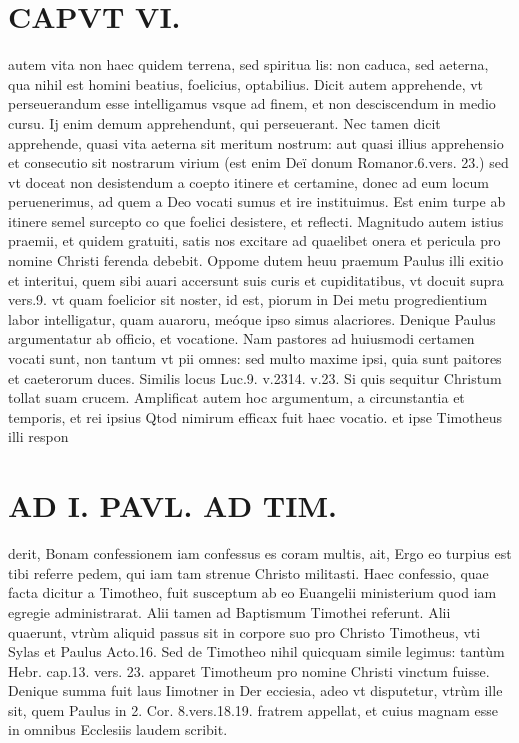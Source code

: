 \documentclass{article}
\begin{document}
\begin{pages}
\section*{CAPVT  VI. }
\marginpar{[ p.46. ]}\pstart autem vita non haec quidem terrena, sed spiritua lis: non caduca, sed aeterna, qua nihil est homini beatius, foelicius, optabilius. Dicit autem apprehende, vt perseuerandum esse intelligamus vsque ad finem, et non desciscendum in medio cursu. Ij enim demum apprehendunt, qui perseuerant. Nec tamen dicit apprehende, quasi vita aeterna sit meritum nostrum: aut quasi illius apprehensio et consecutio sit nostrarum virium (est enim Deï donum Romanor.6.vers. 23.) sed vt doceat non desistendum a coepto itinere et certamine, donec ad eum locum peruenerimus, ad quem a Deo vocati sumus et ire instituimus. Est enim turpe ab itinere semel surcepto co que foelici desistere, et reflecti. Magnitudo autem istius praemii, et quidem gratuiti, satis nos excitare ad quaelibet onera et pericula pro nomine Christi ferenda debebit.  \pend\pstart Oppome dutem heuu praemum Paulus illi exitio et interitui, quem sibi auari accersunt suis curis et cupiditatibus, vt docuit supra vers.9. vt quam foelicior sit noster, id est, piorum in Dei metu progredientium labor intelligatur, quam auaroru, meóque ipso simus alacriores.  \pend\pstart Denique Paulus argumentatur ab officio, et vocatione. Nam pastores ad huiusmodi certamen vocati sunt, non tantum vt pii omnes: sed multo maxime ipsi, quia sunt paitores et caeterorum duces. Similis locus Luc.9. v.2314. v.23. Si quis sequitur Christum tollat suam crucem. Amplificat autem hoc argumentum, a circunstantia et temporis, et rei ipsius Qtod nimirum efficax fuit haec vocatio. et ipse Timotheus illi respon\pend
\section*{AD I. PAVL. AD TIM. }
\marginpar{[ p.466 ]}\pstart derit, Bonam confessionem iam confessus es coram multis, ait, Ergo eo turpius est tibi referre pedem, qui iam tam strenue Christo militasti. Haec confessio, quae facta dicitur a Timotheo, fuit susceptum ab eo Euangelii ministerium quod iam egregie administrarat. Alii tamen ad Baptismum Timothei referunt. Alii quaerunt, vtrùm aliquid passus sit in corpore suo pro Christo Timotheus, vti Sylas et Paulus Acto.16. Sed de Timotheo nihil quicquam simile legimus: tantùm Hebr. cap.13. vers. 23. apparet Timotheum pro nomine Christi vinctum fuisse. Denique summa fuit laus Iimotner in Der ecciesia, adeo vt disputetur, vtrùm ille sit, quem Paulus in 2. Cor. 8.vers.18.19. fratrem appellat, et cuius magnam esse in omnibus Ecclesiis laudem scribit.  \pend
{}
{}

\end{pages}
\end{document}
